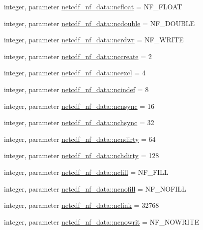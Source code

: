 \begin{DoxyCompactItemize}
integer, parameter \hyperlink{namespacenetcdf__nf__data_a9386c299382dba5511b511942e5093dc}{netcdf\+\_\+nf\+\_\+data\+::ncfloat} = N\+F\+\_\+\+F\+L\+O\+AT
\item 
integer, parameter \hyperlink{namespacenetcdf__nf__data_a1a23437ca0df858742316afd15a5c469}{netcdf\+\_\+nf\+\_\+data\+::ncdouble} = N\+F\+\_\+\+D\+O\+U\+B\+LE
\item 
integer, parameter \hyperlink{namespacenetcdf__nf__data_a99ab1d7f43d8b65e526f4258ccc9ad9a}{netcdf\+\_\+nf\+\_\+data\+::ncrdwr} = N\+F\+\_\+\+W\+R\+I\+TE
\item 
integer, parameter \hyperlink{namespacenetcdf__nf__data_a0cfdf3960977338f3e877e4e48f92d85}{netcdf\+\_\+nf\+\_\+data\+::nccreate} = 2
\item 
integer, parameter \hyperlink{namespacenetcdf__nf__data_a879f774dc85e4c3dc3387b7df34ab161}{netcdf\+\_\+nf\+\_\+data\+::ncexcl} = 4
\item 
integer, parameter \hyperlink{namespacenetcdf__nf__data_aca4bed95537c20a2d370948685a373af}{netcdf\+\_\+nf\+\_\+data\+::ncindef} = 8
\item 
integer, parameter \hyperlink{namespacenetcdf__nf__data_a110301c6c9811906ce8044a3fbf09b5b}{netcdf\+\_\+nf\+\_\+data\+::ncnsync} = 16
\item 
integer, parameter \hyperlink{namespacenetcdf__nf__data_ad2bf346860148061abeeb68421b7bf0c}{netcdf\+\_\+nf\+\_\+data\+::nchsync} = 32
\item 
integer, parameter \hyperlink{namespacenetcdf__nf__data_a501e623096ba68a005164d17ec4d8d49}{netcdf\+\_\+nf\+\_\+data\+::ncndirty} = 64
\item 
integer, parameter \hyperlink{namespacenetcdf__nf__data_a065a170b2aad8e4e4655cf515b96ff00}{netcdf\+\_\+nf\+\_\+data\+::nchdirty} = 128
\item 
integer, parameter \hyperlink{namespacenetcdf__nf__data_aed7a397c61803778ca06e67dc5c039de}{netcdf\+\_\+nf\+\_\+data\+::ncfill} = N\+F\+\_\+\+F\+I\+LL
\item 
integer, parameter \hyperlink{namespacenetcdf__nf__data_ac041023d4eb6ad4fbfc17d19791c34b0}{netcdf\+\_\+nf\+\_\+data\+::ncnofill} = N\+F\+\_\+\+N\+O\+F\+I\+LL
\item 
integer, parameter \hyperlink{namespacenetcdf__nf__data_aa409f012252d130729e94dddd572e375}{netcdf\+\_\+nf\+\_\+data\+::nclink} = 32768
\item 
integer, parameter \hyperlink{namespacenetcdf__nf__data_ad1e0a536032a056da8a53764f01f2a30}{netcdf\+\_\+nf\+\_\+data\+::ncnowrit} = N\+F\+\_\+\+N\+O\+W\+R\+I\+TE

\end{DoxyCompactItemize}
